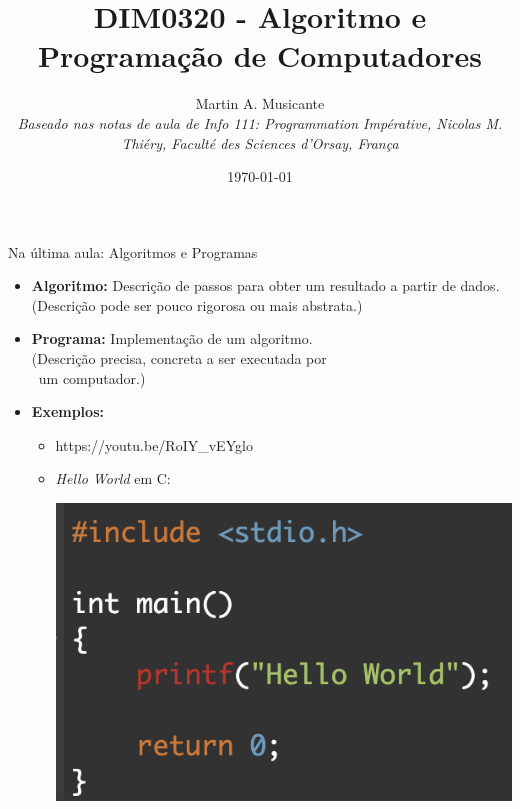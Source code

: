 \documentclass[handout,t]{beamer}
\title[DIM0320]{DIM0320 - Algoritmo e Programação de Computadores}
\date{\today}
\author[M.Musicante]{
	Martin A. Musicante\\%
	\vspace{0.25cm}
	\textsl{\small Baseado nas notas de aula de Info 111: Programmation Impérative, Nicolas M. Thiéry, Faculté des Sciences d’Orsay, França}}
\institute[INSTITUTO]{
	\url{mam@dimap.ufrn.br}\\
	\vspace{0.25cm}
	Departamento de Informática e Matemática Aplicada}
\begin{document}
\frame{\titlepage}


\begin{frame}{Na última aula: Algoritmos e Programas}
\begin{itemize}
    \item \textbf{Algoritmo:} Descrição de passos para obter um resultado a partir de dados. 
    \\ \qquad (Descrição pode ser pouco rigorosa ou mais abstrata.)
    \item \textbf{Programa:} Implementação de um algoritmo.
    \\ \qquad (Descrição precisa, concreta a ser executada por 
    \\ \qquad \ um computador.)
    \item \textbf{Exemplos:}
    \begin{itemize}
        \item https://youtu.be/RoIY\_vEYglo \item \textit{Hello World} em C: 
        
        \qquad\qquad\qquad\qquad
        \includegraphics[scale=0.4]{figuras/helloworld.png}
    \end{itemize}
\end{itemize}
\end{frame}
\end{document}
